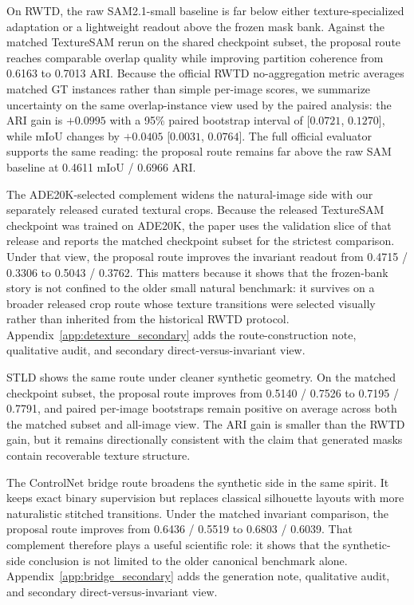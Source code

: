 On RWTD, the raw SAM2.1-small baseline is far below either texture-specialized adaptation or a lightweight readout above the frozen mask bank. Against the matched TextureSAM rerun on the shared checkpoint subset, the proposal route reaches comparable overlap quality while improving partition coherence from 0.6163 to 0.7013 ARI. Because the official RWTD no-aggregation metric averages matched GT instances rather than simple per-image scores, we summarize uncertainty on the same overlap-instance view used by the paired analysis: the ARI gain is $+0.0995$ with a 95\% paired bootstrap interval of [$0.0721$, $0.1270$], while mIoU changes by $+0.0405$ [$0.0031$, $0.0764$]. The full official evaluator supports the same reading: the proposal route remains far above the raw SAM baseline at 0.4611 mIoU / 0.6966 ARI.

The ADE20K-selected complement widens the natural-image side with our separately released curated textural crops. Because the released TextureSAM checkpoint was trained on ADE20K, the paper uses the validation slice of that release and reports the matched checkpoint subset for the strictest comparison. Under that view, the proposal route improves the invariant readout from 0.4715 / 0.3306 to 0.5043 / 0.3762. This matters because it shows that the frozen-bank story is not confined to the older small natural benchmark: it survives on a broader released crop route whose texture transitions were selected visually rather than inherited from the historical RWTD protocol. Appendix~\ref{app:detexture_secondary} adds the route-construction note, qualitative audit, and secondary direct-versus-invariant view.

STLD shows the same route under cleaner synthetic geometry. On the matched checkpoint subset, the proposal route improves from 0.5140 / 0.7526 to 0.7195 / 0.7791, and paired per-image bootstraps remain positive on average across both the matched subset and all-image view. The ARI gain is smaller than the RWTD gain, but it remains directionally consistent with the claim that generated masks contain recoverable texture structure.

The ControlNet bridge route broadens the synthetic side in the same spirit. It keeps exact binary supervision but replaces classical silhouette layouts with more naturalistic stitched transitions. Under the matched invariant comparison, the proposal route improves from 0.6436 / 0.5519 to 0.6803 / 0.6039. That complement therefore plays a useful scientific role: it shows that the synthetic-side conclusion is not limited to the older canonical benchmark alone. Appendix~\ref{app:bridge_secondary} adds the generation note, qualitative audit, and secondary direct-versus-invariant view.

